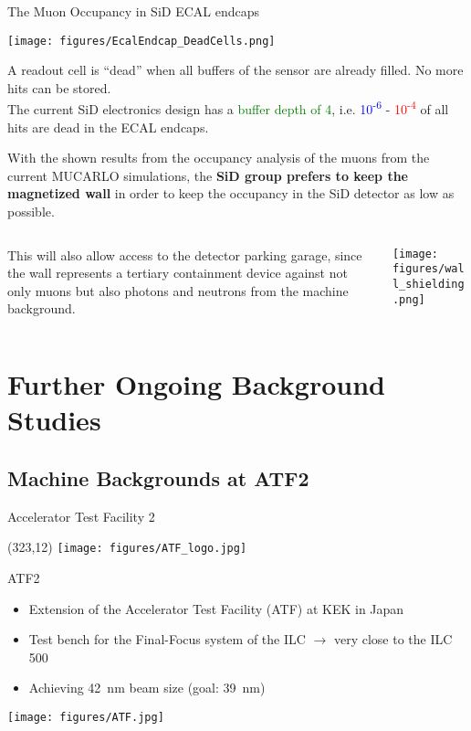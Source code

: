 \documentclass[xcolor={dvipsnames}]{beamer}
\newcommand{\ATFlogo}{
  \setlength{\TPHorizModule}{1pt}
  \setlength{\TPVertModule}{1pt}
  \begin{textblock}{1}(323,12)
   \texttt{[image: figures/ATF\_logo.jpg]}
  \end{textblock}
}
\begin{document}
\begin{frame}{The Muon Occupancy in SiD ECAL endcaps}
\begin{center}
  \texttt{[image: figures/EcalEndcap\_DeadCells.png]}
\end{center}
{\small A readout cell is ``dead'' when all buffers of the sensor are already filled. No more hits can be stored.}\\
The current SiD electronics design has a \textcolor{Green}{buffer depth of 4}, i.e. \textcolor{Blue}{10\textsuperscript{-6}} - \textcolor{Red}{10\textsuperscript{-4}} of all hits are dead in the ECAL endcaps.
\end{frame}
\begin{frame}
 With the shown results from the occupancy analysis of the muons from the current MUCARLO simulations, the \textbf{SiD group prefers to keep the magnetized wall} in order to keep the occupancy in the SiD detector as low as possible.
 \begin{columns}
  \begin{column}{0.4\textwidth}
    This will also allow access to the detector parking garage, since the wall represents a tertiary containment device against not only muons but also photons and neutrons from the machine background.
  \end{column}
  \begin{column}{0.6\textwidth}
    \texttt{[image: figures/wall\_shielding.png]}
  \end{column}
 \end{columns}
\end{frame}

\section{Further Ongoing Background Studies}
\subsection{Machine Backgrounds at ATF2}

\begin{frame}{Accelerator Test Facility 2}
\ATFlogo
ATF2
\begin{itemize}
\item Extension of the Accelerator Test Facility (ATF) at KEK in Japan
\item Test bench for the Final-Focus system of the ILC $\rightarrow$ very close to the ILC 500
\item Achieving \SI{42}{\nano\metre} beam size (goal: \SI{39}{\nano\metre})
\end{itemize}
\vspace*{0.3cm}
\begin{center}
 	\texttt{[image: figures/ATF.jpg]}
\end{center}

\end{frame}
\end{document}
